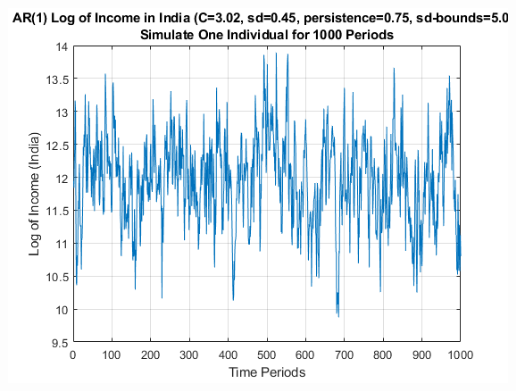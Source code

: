 \documentclass[
]{book}
\begin{document}
\includegraphics[width=5.20833in,height=\textheight]{img/fs_autoregressive_images/figure_1.png}
\end{document}
